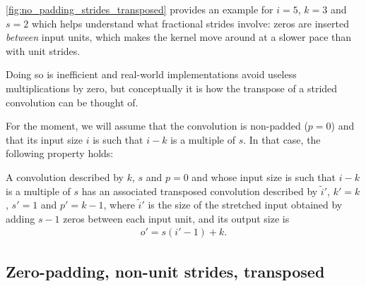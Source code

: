 \documentclass{article}
\begin{document}
\autoref{fig:no_padding_strides_transposed} provides an example for $i = 5$, $k
= 3$ and $s = 2$ which helps understand what fractional strides involve: zeros
are inserted {\em between} input units, which makes the kernel move around at a
slower pace than with unit strides.

Doing so is inefficient and real-world implementations avoid useless
multiplications by zero, but conceptually it is how the transpose of a strided
convolution can be thought of.

For the moment, we will assume that the convolution is non-padded ($p = 0$) and
that its input size $i$ is such that $i - k$ is a multiple of $s$. In that case,
the following property holds:

\begin{prop}\label{prop:no_padding_strides_transposed}
A convolution described by $k$, $s$ and $p = 0$ and whose input size is such
that $i - k$ is a multiple of $s$ has an associated transposed convolution
described by $\tilde{i}'$, $k' = k$, $s' = 1$ and $p' = k - 1$, where
$\tilde{i}'$ is the size of the stretched input obtained by adding $s - 1$ zeros
between each input unit, and its output size is
\begin{equation*}
\begin{split}
    o' = s (i' - 1) + k.
\end{split}
\end{equation*}
\end{prop}

\subsection{Zero-padding, non-unit strides, transposed}
\end{document}
